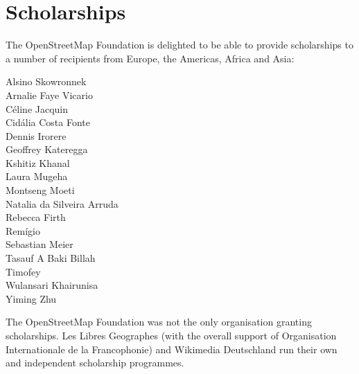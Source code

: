 \newpage
\section*{Scholarships}
\label{scholarships}
\pagestyle{cropmarksstyle}

The OpenStreetMap Foundation is delighted to be able to provide scholarships to a number of
recipients from Europe, the Americas, Africa and Asia:

\RaggedRight
\begin{multicols}{2}
  Alsino Skowronnek\\
  Arnalie Faye Vicario\\
  Céline Jacquin\\
  Cidália Costa Fonte\\
  Dennis Irorere\\
  Geoffrey Kateregga\\
  Kshitiz Khanal\\
  Laura Mugeha\\
  Montseng Moeti\\
  Natalia da Silveira Arruda\\
  Rebecca Firth\\
  Remígio\\
  Sebastian Meier\\
  Tasauf A Baki Billah\\
  Timofey\\
  Wulansari Khairunisa\\
  Yiming Zhu\\
\end{multicols}
\justifying

The OpenStreetMap Foundation was not the only organisation granting scholarships. Les Libres
Geographes (with the overall support of Organisation Internationale de la Francophonie) and Wikimedia Deutschland run their own and independent scholarship programmes.

